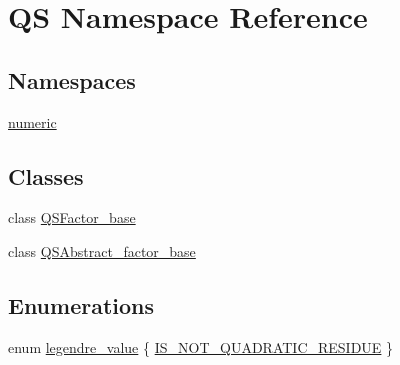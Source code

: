 \hypertarget{namespaceQS}{\section{Q\-S Namespace Reference}
\label{namespaceQS}
}
\subsection*{Namespaces}
\begin{DoxyCompactItemize}
\item 
\hyperlink{namespaceQS_1_1numeric}{numeric}
\end{DoxyCompactItemize}
\subsection*{Classes}
\begin{DoxyCompactItemize}
\item 
class \hyperlink{classQS_1_1QSFactor__base}{Q\-S\-Factor\-\_\-base}
\item 
class \hyperlink{classQS_1_1QSAbstract__factor__base}{Q\-S\-Abstract\-\_\-factor\-\_\-base}
\end{DoxyCompactItemize}
\subsection*{Enumerations}
\begin{DoxyCompactItemize}
\item 
enum \hyperlink{namespaceQS_a024d1d769604dfe6754960df275f87c5}{legendre\-\_\-value} \{ \hyperlink{namespaceQS_a024d1d769604dfe6754960df275f87c5a2dbd3ee2718c9e8cb4b8fbb27331b354}{I\-S\-\_\-\-N\-O\-T\-\_\-\-Q\-U\-A\-D\-R\-A\-T\-I\-C\-\_\-\-R\-E\-S\-I\-D\-U\-E}
 \}
\end{DoxyCompactItemize}


